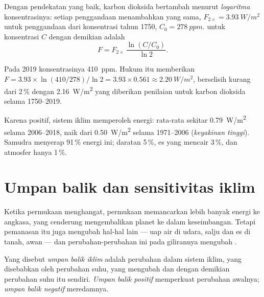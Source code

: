 \begin{proposition}\label{prop:g12:climate-change:log}
Dengan pendekatan yang baik,  karbon dioksida bertambah menurut
\emph{logaritma} konsentrasinya: setiap penggandaan menambahkan  yang sama,
$F_{2\times} = \qty{3.93}{W/m^2}$ untuk penggandaan dari konsentrasi tahun
1750, $C_0 = \qty{278}{ppm}$.  untuk konsentrasi $C$ dengan demikian adalah
\[
  F = F_{2\times}\,\frac{\ln (C/C_0)}{\ln 2}.
\]
\end{proposition}

\begin{example}\label{ex:g12:climate-change:check}
Pada 2019 konsentrasinya \qty{410}{ppm}. Hukum itu memberikan
$F = 3.93 \times \ln(410/278)/\ln 2 = 3.93 \times 0.561 \approx
\qty{2.20}{W/m^2}$, berselisih kurang dari 2\,\% dengan \qty{2.16}{W/m^2} yang diberikan
penilaian untuk karbon dioksida selama 1750--2019.
\end{example}

\begin{proposition}\label{prop:g12:climate-change:heating}
Karena  positif, sistem iklim memperoleh energi: rata-rata sekitar
\qty{0.79}{W/m^2} selama 2006--2018, naik dari \qty{0.50}{W/m^2} selama
1971--2006 (\emph{keyakinan tinggi}). Samudra menyerap 91\,\% energi ini;
daratan 5\,\%, es yang mencair 3\,\%, dan atmosfer hanya 1\,\%.
\end{proposition}

\section{Umpan balik dan sensitivitas iklim}

Ketika permukaan menghangat, permukaan memancarkan lebih banyak energi ke
angkasa, yang cenderung mengembalikan planet ke dalam keseimbangan. Tetapi
pemanasan itu juga mengubah hal-hal lain --- uap air di udara, salju dan es di
tanah, awan --- dan perubahan-perubahan ini pada gilirannya mengubah .

\begin{definition}\label{def:g12:climate-change:feedback}
Yang disebut \emph{umpan balik iklim} adalah perubahan
dalam sistem iklim, yang disebabkan oleh perubahan suhu, yang mengubah  dan dengan demikian perubahan suhu itu sendiri. \emph{Umpan balik
positif} memperkuat perubahan awalnya; \emph{umpan balik negatif} meredamnya.
\end{definition}

